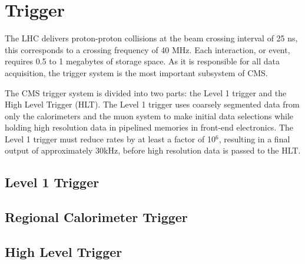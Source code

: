 \section{Trigger}
The LHC delivers proton-proton collisions at the beam crossing 
interval of 25 ns, this corresponds to a crossing frequency of 40 MHz.
Each interaction, or event, requires 0.5 to 1 megabytes of storage space.
As it is responsible for all data acquisition, %
the trigger system is the most important subsystem of CMS. 

The CMS trigger system is divided into two parts: the Level 1 trigger 
and the High Level Trigger (HLT). 
The Level 1 trigger uses coarsely segmented
data from only the calorimeters and the muon system to make initial
data selections while holding high resolution data in pipelined memories
in front-end electronics. 
The Level 1 trigger must reduce rates by at least a factor of 10$^{6}$, 
resulting in a final output of approximately 30kHz,
before high resolution data is passed to the HLT.
  \subsection{Level 1 Trigger}
  \subsection{Regional Calorimeter Trigger}
  \subsection{High Level Trigger}
